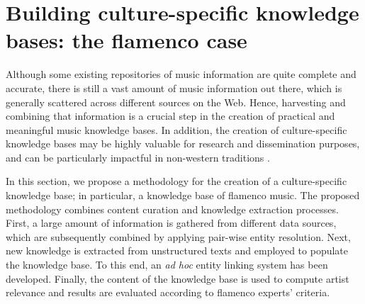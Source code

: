 \section[Building culture-specific knowledge bases: the flamenco case][Building culture-specific KBs: the flamenco case]{Building culture-specific knowledge bases: the flamenco case}
\label{sec:musicology:flamenco-kb}


Although some existing repositories of music information are quite complete and accurate, there is still a vast amount of music information out there, which is generally scattered across different sources on the Web. Hence, harvesting and combining that information is a crucial step in the creation of practical and meaningful music knowledge bases. In addition, the creation of culture-specific knowledge bases may be highly valuable for research and dissemination purposes, and can be particularly impactful in non-western traditions \citep{Serra2014compmusic}. 

In this section, we propose a methodology for the creation of a culture-specific knowledge base; in particular, a knowledge base of flamenco music. The proposed methodology combines content curation and knowledge extraction processes. First, a large amount of information is gathered from different data sources, which are subsequently combined by applying pair-wise entity resolution. Next, new knowledge is extracted from unstructured texts and employed to populate the knowledge base. To this end, an \textit{ad hoc} entity linking system has been developed. Finally, the content of the knowledge base is used to compute artist relevance and results are evaluated according to flamenco experts' criteria. %


